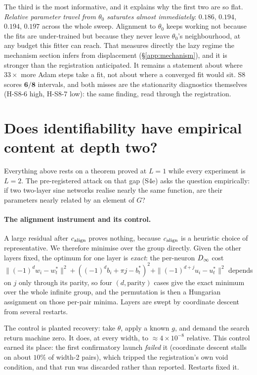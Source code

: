The third is the most informative, and it explains why the first two are so flat. \emph{Relative
parameter travel from $\theta_0$ saturates almost immediately}: $0.186$, $0.194$, $0.194$, $0.197$
across the whole sweep. Alignment to $\theta_0$ keeps working not because the fits are
under-trained but because they never leave $\theta_0$'s neighbourhood, at any budget this fitter
can reach. That measures directly the lazy regime the mechanism section infers from displacement
(\S\ref{app:mechanism}), and it is stronger than the registration anticipated. It remains a
statement about where $33\times$ more Adam steps take a fit, not about where a converged fit would
sit. S8 scores $\mathbf{6/8}$ intervals, and both misses are the stationarity diagnostics
themselves (H-S8-6 high, H-S8-7 low): the same finding, read through the registration.


\section{Does identifiability have empirical content at depth two?}\label{app:s4e}

Everything above rests on a theorem proved at $L=1$ while every experiment is $L=2$. The
pre-registered attack on that gap (S4e) asks the question empirically: if two two-layer sine
networks realise nearly the same function, are their parameters nearly related by an element of
$G$?

\paragraph{The alignment instrument and its control.} A large residual after
$c_{\mathrm{align}}$ proves nothing, because $c_{\mathrm{align}}$ is a heuristic choice of representative. We therefore
minimise over the group directly. Given the other layers fixed, the optimum for one layer is
\emph{exact}: the per-neuron $D_\infty$ cost
$\|(-1)^dw_i - w^*_t\|^2 + ((-1)^db_i + \pi j - b^*_t)^2 + \|(-1)^{d+j}u_i - u^*_t\|^2$
depends on $j$ only through its parity, so four $(d,\text{parity})$ cases give the exact minimum
over the whole infinite group, and the permutation is then a Hungarian assignment on those
per-pair minima. Layers are swept by coordinate descent from several restarts.

The control is planted recovery: take $\theta$, apply a known $g$, and demand the search return
machine zero. It does, at every width, to $\approx4\times10^{-8}$ relative. This control earned its place: the first confirmatory launch \emph{failed} it (coordinate descent stalls on about
$10\%$ of width-2 pairs), which tripped the registration's own void condition, and that run was
discarded rather than reported. Restarts fixed it.

